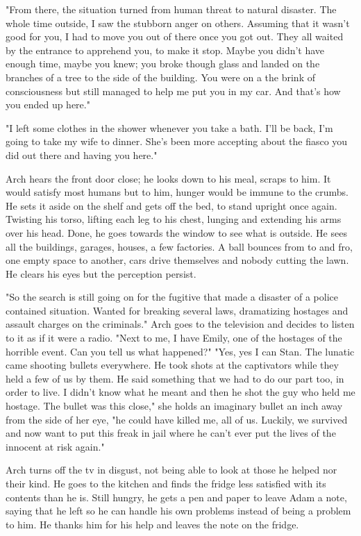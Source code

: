 		"From there, the situation turned from human threat to natural disaster. The whole time outside, I saw the stubborn anger on others. Assuming that it
	wasn't good for you, I had to move you out of there once you got out. They all waited by the entrance to apprehend you, to make it stop. Maybe you didn't have
	enough time, maybe you knew; you broke though glass and landed on the branches of a tree to the side of the building. You were on a the brink of consciousness
	but still managed to help me put you in my car. And that's how you ended up here."

		"I left some clothes in the shower whenever you take a bath. I'll be back, I'm going to take my wife to dinner. She's been more accepting about the
	fiasco you did out there and having you here."

		Arch hears the front door close; he looks down to his meal, scraps to him. It would satisfy most humans but to him, hunger would be immune to the 
	crumbs. He sets it aside on the shelf and gets off the bed, to stand upright once again. Twisting his torso, lifting each leg to his chest, lunging and
	extending his arms over his head. Done, he goes towards the window to see what is outside. He sees all the buildings, garages, houses, a few factories. A ball
	bounces from to and fro, one empty space to another, cars drive themselves and nobody cutting the lawn. He clears his eyes but the perception persist.

		"So the search is still going on for the fugitive that made a disaster of a police contained situation. Wanted for breaking several laws, dramatizing
	hostages and assault charges on the criminals." Arch goes to the television and decides to listen to it as if it were a radio. "Next to me, I have Emily,
	one of the hostages of the horrible event. Can you tell us what happened?" "Yes, yes I can Stan. The lunatic came shooting bullets everywhere. He took shots
	at the captivators while they held a few of us by them. He said something that we had to do our part too, in order to live. I didn't know what he meant and
	then he shot the guy who held me hostage. The bullet was this close," she holds an imaginary bullet an inch away from the side of her eye, "he could have 
	killed me, all of us. Luckily, we survived and now want to put this freak in jail where he can't ever put the lives of the innocent at risk again."

		Arch turns off the tv in disgust, not being able to look at those he helped nor their kind. He goes to the kitchen and finds the fridge less satisfied
	with its contents than he is. Still hungry, he gets a pen and paper to leave Adam a note, saying that he left so he can handle his own problems instead of
	being a problem to him. He thanks him for his help and leaves the note on the fridge.

